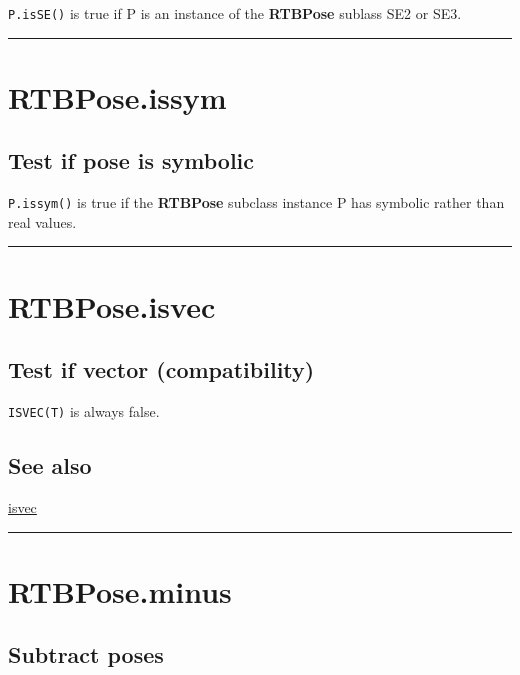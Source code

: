 \texttt{P.isSE()} is true if P is an instance of the \textbf{\color{red} RTBPose} sublass SE2 or SE3.

\vspace{1.5ex}\hrule

\hypertarget{RTBPose.issym}{\section*{RTBPose.issym}}
\subsection*{Test if pose is symbolic}


\texttt{P.issym()} is true if the \textbf{\color{red} RTBPose} subclass instance P has symbolic rather
than real values.

\vspace{1.5ex}\hrule

\hypertarget{RTBPose.isvec}{\section*{RTBPose.isvec}}
\subsection*{Test if vector (compatibility)}


\texttt{ISVEC(T)} is always false.


\subsection*{See also}


\hyperlink{isvec}{\color{blue} isvec}

\vspace{1.5ex}\hrule

\hypertarget{RTBPose.minus}{\section*{RTBPose.minus}}
\subsection*{Subtract poses}


